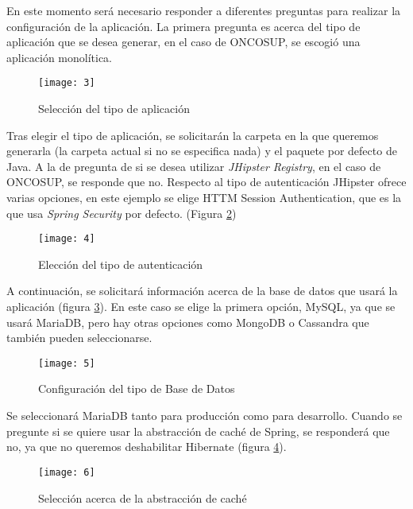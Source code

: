 En este momento será necesario responder a diferentes preguntas para realizar la configuración de la aplicación. La primera pregunta es acerca del tipo de aplicación que se desea generar, en el caso de ONCOSUP, se escogió una aplicación monolítica.

\begin{figure}[!h]
\begin{center}
\texttt{[image: 3]}
\caption{Selección del tipo de aplicación}
\label{fig:3}
\end{center}
\end{figure} 
\clearpage

Tras elegir el tipo de aplicación, se solicitarán la carpeta en la que queremos generarla (la carpeta actual si no se especifica nada) y el paquete por defecto de Java. A la de pregunta de si se desea utilizar \emph{JHipster Registry}, en el caso de ONCOSUP, se responde que no. Respecto al tipo de autenticación JHipster ofrece varias opciones, en este ejemplo se elige HTTM Session Authentication, que es la que usa \emph{Spring Security} por defecto. (Figura \ref{fig:4})

\begin{figure}[!h]
\begin{center}
\texttt{[image: 4]}
\caption{Elección del tipo de autenticación}
\label{fig:4}
\end{center}
\end{figure} 

A continuación, se solicitará información acerca de la base de datos que usará la aplicación (figura \ref{fig:5}). En este caso se elige la primera opción, MySQL, ya que se usará MariaDB, pero hay otras opciones como MongoDB o Cassandra que también pueden seleccionarse.

\begin{figure}[!h]
\begin{center}
\texttt{[image: 5]}
\caption{Configuración del tipo de Base de Datos}
\label{fig:5}
\end{center}
\end{figure} 

Se seleccionará MariaDB tanto para producción como para desarrollo. Cuando se pregunte si se quiere usar la abstracción de caché de Spring, se responderá que no, ya que no queremos deshabilitar Hibernate (figura \ref{fig:6}).

\begin{figure}[!h]
\begin{center}
\texttt{[image: 6]}
\caption{Selección acerca de la abstracción de caché}
\label{fig:6}
\end{center}
\end{figure} 
\clearpage

